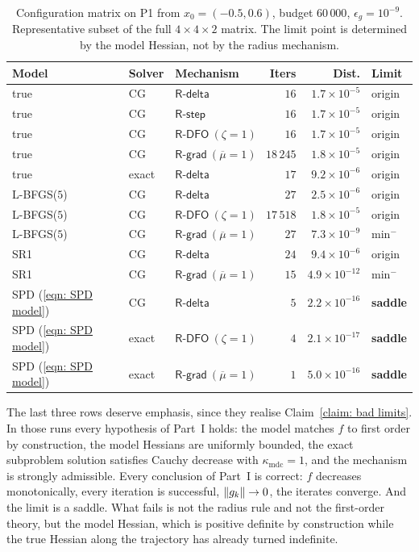 \documentclass[11pt]{article}
\theoremstyle{plain}
\theoremstyle{definition}
\theoremstyle{remark}
\numberwithin{equation}{section}
\newcommand*\mykappa[1]{\kappa_{\scriptscriptstyle\text{#1}}}
\newcommand{\Rdelta}{\textsf{R-delta}}
\newcommand{\Rstep}{\textsf{R-step}}
\newcommand{\Rdfo}{\textsf{R-DFO}}
\newcommand{\Rgrad}{\textsf{R-grad}}
\begin{document}
\begin{table}[htbp]
  \centering
  \caption{Configuration matrix on P1 from $x_0 = (-0.5,0.6)$, budget $60\,000$,
           $\epsilon_g = 10^{-9}$. Representative subset of the full $4\times4\times2$ matrix.
           The limit point is determined by the model Hessian, not by the radius mechanism.}
  \label{tab: config matrix}
  \small
  \begin{tabular}{lllrrl}
    \toprule
    Model & Solver & Mechanism & Iters & Dist. & Limit \\
    \midrule
    true        & CG    & $\Rdelta$              & $16$      & $1.7\times10^{-5}$  & origin \\
    true        & CG    & $\Rstep$               & $16$      & $1.7\times10^{-5}$  & origin \\
    true        & CG    & $\Rdfo\ (\zeta=1)$     & $16$      & $1.7\times10^{-5}$  & origin \\
    true        & CG    & $\Rgrad\ (\overline{\mu}=1)$ & $18\,245$ & $1.8\times10^{-5}$ & origin \\
    true        & exact & $\Rdelta$              & $17$      & $9.2\times10^{-6}$  & origin \\
    \midrule
    L-BFGS($5$) & CG    & $\Rdelta$              & $27$      & $2.5\times10^{-6}$  & origin \\
    L-BFGS($5$) & CG    & $\Rdfo\ (\zeta=1)$     & $17\,518$ & $1.8\times10^{-5}$  & origin \\
    L-BFGS($5$) & CG    & $\Rgrad\ (\overline{\mu}=1)$ & $27$ & $7.3\times10^{-9}$ & $\text{min}^{-}$ \\
    SR1         & CG    & $\Rdelta$              & $24$      & $9.4\times10^{-6}$  & origin \\
    SR1         & CG    & $\Rgrad\ (\overline{\mu}=1)$ & $15$ & $4.9\times10^{-12}$ & $\text{min}^{-}$ \\
    \midrule
    SPD (\ref{eqn: SPD model}) & CG    & $\Rdelta$          & $5$ & $2.2\times10^{-16}$ & \textbf{saddle} \\
    SPD (\ref{eqn: SPD model}) & exact & $\Rdfo\ (\zeta=1)$ & $4$ & $2.1\times10^{-17}$ & \textbf{saddle} \\
    SPD (\ref{eqn: SPD model}) & exact & $\Rgrad\ (\overline{\mu}=1)$ & $1$ & $5.0\times10^{-16}$ & \textbf{saddle} \\
    \bottomrule
  \end{tabular}
\end{table}

The last three rows deserve emphasis, since they realise Claim~\ref{claim: bad limits}. In those
runs every hypothesis of Part~I holds: the model matches $f$ to first order by construction, the
model Hessians are uniformly bounded, the exact subproblem solution satisfies Cauchy decrease
with $\mykappa{mdc} = 1$, and the mechanism is strongly admissible. Every conclusion of Part~I
is correct: $f$ decreases monotonically, every iteration is successful, $\left \lVert g_k \right \rVert \to 0$, the
iterates converge. And the limit is a saddle. What fails is not the radius rule and not the
first-order theory, but the model Hessian, which is positive definite by construction while the
true Hessian along the trajectory has already turned indefinite.
\end{document}
